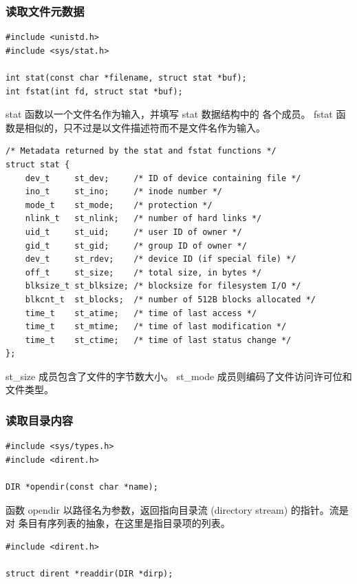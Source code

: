 \subsubsection{读取文件元数据}

\begin{lstlisting}[style=CStyle]
#include <unistd.h>
#include <sys/stat.h>

int stat(const char *filename, struct stat *buf);
int fstat(int fd, struct stat *buf);
\end{lstlisting}

stat 函数以一个文件名作为输入，并填写 stat 数据结构中的
各个成员。 fstat 函数是相似的，只不过是以文件描述符而不是文件名作为输入。

\begin{lstlisting}[style=CStyle]
/* Metadata returned by the stat and fstat functions */
struct stat {
    dev_t     st_dev;     /* ID of device containing file */
    ino_t     st_ino;     /* inode number */
    mode_t    st_mode;    /* protection */
    nlink_t   st_nlink;   /* number of hard links */
    uid_t     st_uid;     /* user ID of owner */
    gid_t     st_gid;     /* group ID of owner */
    dev_t     st_rdev;    /* device ID (if special file) */
    off_t     st_size;    /* total size, in bytes */
    blksize_t st_blksize; /* blocksize for filesystem I/O */
    blkcnt_t  st_blocks;  /* number of 512B blocks allocated */
    time_t    st_atime;   /* time of last access */
    time_t    st_mtime;   /* time of last modification */
    time_t    st_ctime;   /* time of last status change */
};
\end{lstlisting}

st\_size 成员包含了文件的字节数大小。 st\_mode 成员则编码了文件访问许可位和文件类型。

\subsubsection{读取目录内容}

\begin{lstlisting}[style=CStyle]
#include <sys/types.h>
#include <dirent.h>

DIR *opendir(const char *name);
\end{lstlisting}

函数 opendir 以路径名为参数，返回指向目录流 (directory stream) 的指针。流是对
条目有序列表的抽象，在这里是指目录项的列表。

\begin{lstlisting}[style=CStyle]
#include <dirent.h>

struct dirent *readdir(DIR *dirp);
\end{lstlisting}

